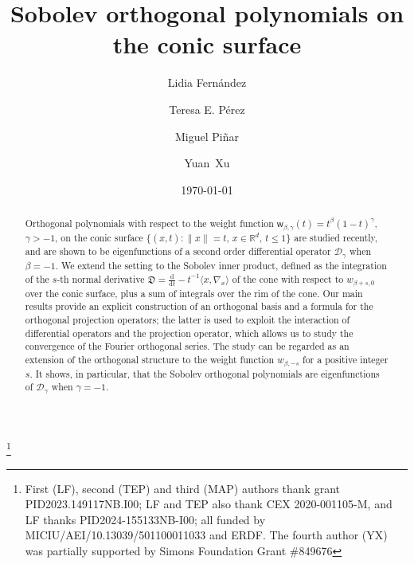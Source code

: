\documentclass{amsart}
\theoremstyle{remark}
\def\la{{\langle}}
\def\ra{{\rangle}}
\def\d{\mathrm{d}}
\def\sw{{\mathsf w}}
\def\fD{{\mathfrak D}}
\def\b{{\beta}}
\def\g{{\gamma}}
\def\la{{\langle}}
\def\ra{{\rangle}}
\def\CD{{\mathcal D}}
\begin{document}
\title{Sobolev orthogonal polynomials on the conic surface}
\author[L. Fern\'andez]{Lidia Fern\'andez}
\address{Instituto de Matem\'aticas IMAG \&
Departamento de Matem\'{a}tica Aplicada. Universidad de Granada (Spain)}

\author[T. E. P\'erez]{Teresa E. P\'erez}
\address{Instituto
de Matem\'aticas IMAG \&
Departamento de Matem\'{a}tica Aplicada. Universidad de Granada (Spain)}

\author[M. A. Pi\~nar]{Miguel Pi\~nar}
\address{Instituto
de Matem\'aticas IMAG \&
Departamento de Matem\'{a}tica Aplicada. Universidad de Granada (Spain)}
\author[Y. Xu]{Yuan~Xu}
\address{Department of Mathematics, University of Oregon, Eugene,
OR 97403--1222, USA}
\thanks{
First (LF), second (TEP) and third (MAP) authors thank grant PID2023.149117NB.I00; LF and TEP also thank CEX
2020-001105-M, and LF thanks PID2024-155133NB-I00; all funded by MICIU/AEI/10.13039/501100011033 and ERDF. The fourth author (YX) was partially supported by 
 Simons Foundation Grant \#849676}
\date{\today}

\begin{abstract}
Orthogonal polynomials with respect to the weight function $\sw_{\b,\g}(t) = t^\beta (1-t)^\gamma$,
$\gamma > -1$, on the conic surface $\{(x,t): \|x\| = t, \, x \in \mathbb{R}^d, \, t \le 1\}$ are studied recently, and
are shown to be eigenfunctions of a second order differential operator $\CD_\gamma$ when $\beta =-1$.
We extend the setting to the Sobolev inner product, defined as the integration of the $s$-th normal derivative
$\fD = \frac{\d}{\d t} - t^{-1} \la x, \nabla_x\ra$ of the cone with respect to $w_{\beta+s,0}$ over the conic surface, 
plus a sum of integrals over the rim of the cone. Our main results provide an explicit construction of an 
orthogonal basis and a formula for the orthogonal
projection operators; the latter is used to exploit the interaction of differential operators and the projection operator,
which allows us to study the convergence of the Fourier orthogonal series. The study can be regarded as an
extension of the orthogonal structure to the weight function $w_{\beta, -s}$ for a positive integer $s$. It shows,
in particular, that the Sobolev orthogonal polynomials are eigenfunctions of $\CD_{\gamma}$ when $\gamma = -1$.
\end{abstract}
\end{document}
